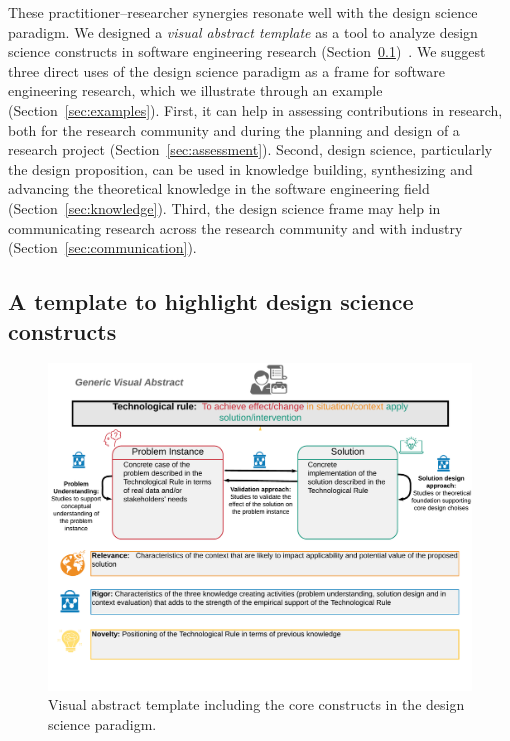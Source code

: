 \documentclass[graybox]{svmult}
\begin{document}
These practitioner--researcher synergies resonate well with the design science paradigm. We designed a \emph{visual abstract template} as a tool to analyze design science constructs in software engineering research  (Section~\ref{sec:VA_template})~\cite{StoreyESEM17}. We suggest three direct uses of the design science paradigm as a frame for software engineering research, which we illustrate through an example (Section~\ref{sec:examples}). First, it can help in assessing contributions in research, both for the research community and during the planning and design of a research project (Section~\ref{sec:assessment}). Second, design science, particularly the design proposition, can be used in knowledge building, synthesizing and advancing the theoretical knowledge in the software engineering field (Section~\ref{sec:knowledge}). Third, the design science frame may help in communicating research across the research community and with industry (Section~\ref{sec:communication}). 


\subsection{A template to highlight design science constructs}%
\label{sec:VA_template}

\begin{figure}[t]
\includegraphics[width=1.0\textwidth, trim={0 15mm 0 0},clip]{Figures/GenericVA.png}
\caption{Visual abstract template including the core constructs in the design science paradigm.}
\label{fig:VA-template}      
\end{figure}
\end{document}
